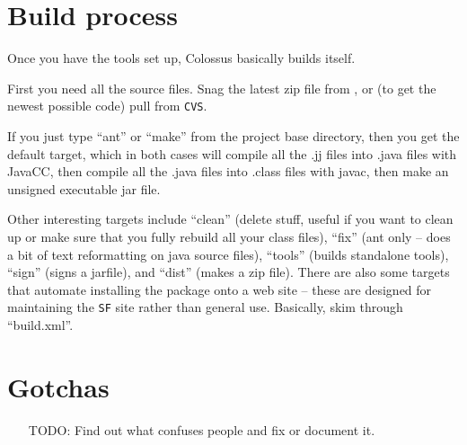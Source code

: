 \documentclass{article}
\begin{document}
\section{Build process}

Once you have the tools set up, Colossus basically builds itself.

First you need all the source files. Snag the latest zip file from 
,
or (to get the newest possible code) pull from \texttt{CVS}.

If you just type ``ant'' or ``make'' from the project base directory,
then you get the default target, which in both cases will compile
all the .jj files into .java files with JavaCC, then compile all
the .java files into .class files with javac, then make an unsigned
executable jar file.

Other interesting targets include ``clean'' (delete stuff, useful if
you want to clean up or make sure that you fully rebuild all your
class files), ``fix'' (ant only -- does a bit of text reformatting on
java source files), ``tools'' (builds standalone tools), ``sign'' (signs
a jarfile), and ``dist'' (makes a zip file). There are also some
targets that automate installing the package onto a web site --
these are designed for maintaining the \texttt{SF} site rather than general
use. Basically, skim through ``build.xml''.

\section{Gotchas}

\begin{itemize}
\item[TODO:] Find out what confuses people and fix or document it.
\end{itemize}



\end{document}
